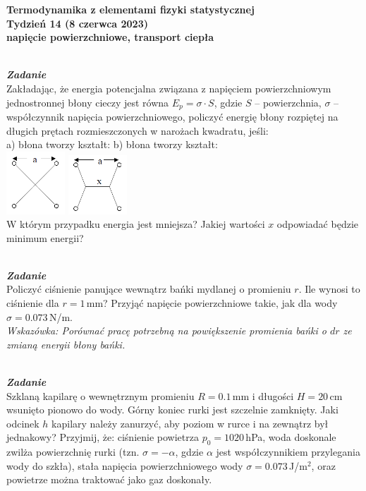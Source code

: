 \documentclass[11pt,a4paper]{article}
\newcounter{zadanie}\newcommand{\zadanie}[1][]{\addtocounter{zadanie}{1} ~\\  {\bf \emph{Zadanie \arabic{zadanie} #1 }} \\}
\begin{document}
\begin{centering}

\vspace*{-1cm}

\bf{\Large{Termodynamika z elementami fizyki statystycznej}}\\
Tydzień 14 (8 czerwca 2023)\\[5mm]
napięcie powierzchniowe, transport ciepła\\
\end{centering} 

\vspace*{0mm}
\zadanie
Zakładając, że energia potencjalna związana z napięciem powierzchniowym jednostronnej błony cieczy jest
równa $E_p = \sigma \cdot S$, gdzie $S$ – powierzchnia, $\sigma$ – współczynnik napięcia
powierzchniowego, policzyć energię błony rozpiętej na długich prętach rozmieszczonych
w narożach kwadratu, jeśli:\\[1mm]
\hspace*{10ex} a) błona tworzy kształt:
\hspace*{20ex} b) błona tworzy kształt: \\
\hspace*{13ex}\includegraphics[width=22mm]{blona1.png}
\hspace*{32ex}\includegraphics[width=22mm]{blona2.png}
\\
W którym przypadku energia jest mniejsza? Jakiej wartości $x$ odpowiadać będzie minimum energii?

\zadanie
Policzyć ciśnienie panujące wewnątrz bańki mydlanej o promieniu $r$.
Ile wynosi to ciśnienie dla $r = 1$\,mm? Przyjąć napięcie powierzchniowe takie,
jak dla wody $\sigma = 0.073$\,N/m.\\[1mm]
{\em Wskazówka: Porównać pracę potrzebną na powiększenie promienia bańki o $dr$
ze zmianą energii błony bańki.}

\zadanie
Szklaną kapilarę o wewnętrznym promieniu $R = 0.1$\,mm i długości $H = 20$\,cm wsunięto pionowo
do wody. Górny koniec rurki jest szczelnie zamknięty. Jaki odcinek $h$ kapilary należy zanurzyć,
aby poziom w rurce i na zewnątrz był jednakowy?
Przyjmij, że: ciśnienie powietrza $p_0 = 1020$\,hPa,
woda doskonale zwilża powierzchnię rurki (tzn. $\sigma=-\alpha$,
gdzie $\alpha$ jest współczynnikiem przylegania wody do szkła),
stała napięcia powierzchniowego wody $\sigma = 0.073$\,J/m$^2$,
oraz powietrze można traktować jako gaz doskonały.
\end{document}
